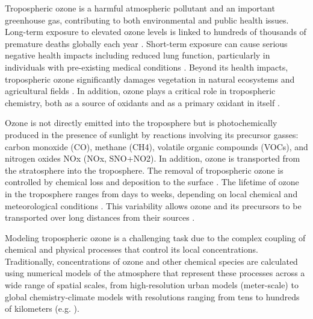 \documentclass[gmd, manuscript]{copernicus}
\begin{document}
\introduction  %
Tropospheric ozone is a harmful atmospheric pollutant and an important greenhouse gas, contributing to both environmental and public health issues. Long-term exposure to elevated ozone levels is linked to hundreds of thousands of premature deaths globally each year \citep{malashock_global_2022, malley_updated_2017, health_effects_institute_state_2024}. Short-term exposure can cause serious negative health impacts \citep{bell_who_2014} including reduced lung function, particularly in individuals with pre-existing medical conditions \citep{us2020integrated}. Beyond its health impacts, tropospheric ozone significantly damages vegetation in natural ecosystems and agricultural fields \citep{mills_ozone_2018}. In addition, ozone plays a critical role  in tropospheric chemistry, both as a source of oxidants and as a primary oxidant in itself \citep{monks_tropospheric_2015}.

Ozone is not directly emitted into the troposphere but is photochemically produced in the presence of sunlight by reactions involving its precursor gasses: carbon monoxide (CO), methane (CH4), volatile organic compounds (VOCs), and nitrogen oxides NOx (NOx, SNO+NO2). In addition, ozone is transported from the stratosphere into the troposphere. The removal of tropospheric ozone is controlled by chemical loss and deposition to the surface \citep{archibald_tropospheric_2020}. The lifetime of ozone in the troposphere ranges from days to weeks, depending on local chemical and meteorological conditions \citep{lelieveld_what_2000, monks_tropospheric_2015}. This variability allows ozone and its precursors to be transported over long distances from their sources \citep{fiore_multimodel_2009}.

Modeling tropospheric ozone is a challenging task due to the complex coupling of chemical and physical processes that control its local concentrations. Traditionally, concentrations of ozone and other chemical species are calculated using numerical models of the atmosphere that represent these processes across a wide range of spatial scales, from high-resolution urban models (meter-scale) to global chemistry-climate models with resolutions ranging from tens to hundreds of kilometers (e.g. \citet{Morgenstern2017}). 
\end{document}
